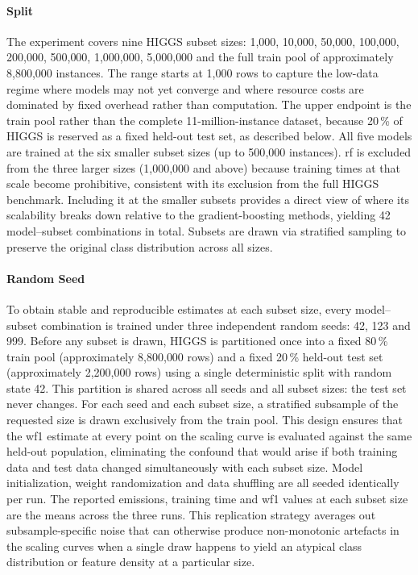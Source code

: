 \paragraph{Split}
The experiment covers nine HIGGS subset sizes: 1{,}000, 10{,}000, 50{,}000, 100{,}000, 200{,}000, 500{,}000, 1{,}000{,}000, 5{,}000{,}000 and the full train pool of approximately 8{,}800{,}000 instances. The range starts at 1{,}000 rows to capture the low-data regime where models may not yet converge and where resource costs are dominated by fixed overhead rather than computation. The upper endpoint is the train pool rather than the complete 11-million-instance dataset, because 20\,\% of HIGGS is reserved as a fixed held-out test set, as described below. All five models are trained at the six smaller subset sizes (up to 500{,}000 instances). \gls{rf} is excluded from the three larger sizes (1{,}000{,}000 and above) because training times at that scale become prohibitive, consistent with its exclusion from the full HIGGS benchmark. Including it at the smaller subsets provides a direct view of where its scalability breaks down relative to the gradient-boosting methods, yielding 42 model--subset combinations in total. Subsets are drawn via stratified sampling to preserve the original class distribution across all sizes.

\paragraph{Random Seed}
To obtain stable and reproducible estimates at each subset size, every model--subset combination is trained under three independent random seeds: 42, 123 and 999. Before any subset is drawn, HIGGS is partitioned once into a fixed 80\,\% train pool (approximately 8{,}800{,}000 rows) and a fixed 20\,\% held-out test set (approximately 2{,}200{,}000 rows) using a single deterministic split with random state 42. This partition is shared across all seeds and all subset sizes: the test set never changes. For each seed and each subset size, a stratified subsample of the requested size is drawn exclusively from the train pool. This design ensures that the \gls{wf1} estimate at every point on the scaling curve is evaluated against the same held-out population, eliminating the confound that would arise if both training data and test data changed simultaneously with each subset size. Model initialization, weight randomization and data shuffling are all seeded identically per run. The reported emissions, training time and \gls{wf1} values at each subset size are the means across the three runs. This replication strategy averages out subsample-specific noise that can otherwise produce non-monotonic artefacts in the scaling curves when a single draw happens to yield an atypical class distribution or feature density at a particular size.

